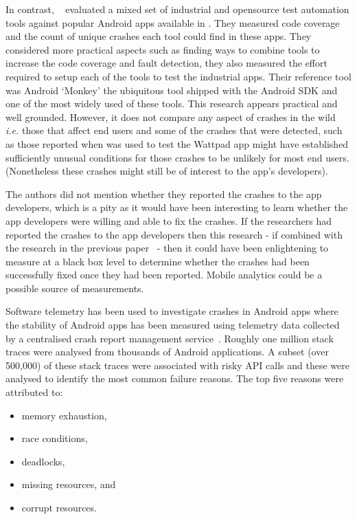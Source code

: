 In contrast, ~ evaluated a mixed set of industrial and opensource test automation tools against popular Android apps available in . They measured code coverage and the count of unique crashes each tool could find in these apps. They considered more practical aspects such as finding ways to combine tools to increase the code coverage and fault detection, they also measured the effort required to setup each of the tools to test the industrial apps. Their reference tool was Android `Monkey' the ubiquitous tool shipped with the Android SDK and one of the most widely used of these tools. This research appears practical and well grounded. However, it does not compare any aspect of crashes in the wild \emph{i.e.} those that affect end users and some of the crashes that were detected, such as those reported when  was used to test the Wattpad app might have established sufficiently unusual conditions for those crashes to be unlikely for most end users. (Nonetheless these crashes might still be of interest to the app's developers). 

The authors did not mention whether they reported the crashes to the app developers, which is a pity as it would have been interesting to learn whether the app developers were willing and able to fix the crashes. If the researchers had reported the crashes to the app developers then this research - if combined with the research in the previous paper~ - then it could have been enlightening to measure at a black box level to determine whether the crashes had been successfully fixed once they had been reported. Mobile analytics could be a possible source of measurements.

Software telemetry has been used to investigate crashes in Android apps where the stability of Android apps has been measured using telemetry data collected by a centralised crash report management service~. Roughly one million stack traces were analysed from thousands of Android applications. A subset (over 500,000) of these stack traces were associated with risky API calls and these were analysed to identify the most common failure reasons. The top five reasons were attributed to:

\begin{itemize}
    \item memory exhaustion,
    \item race conditions,
    \item deadlocks,
    \item missing resources, and
    \item corrupt resources.
\end{itemize}
    

